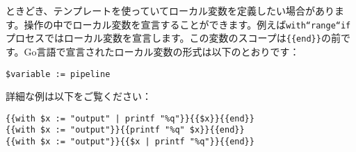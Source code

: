 ときどき、テンプレートを使っていてローカル変数を定義したい場合があります。操作の中でローカル変数を宣言することができます。例えば\texttt{with``range``if}プロセスではローカル変数を宣言します。この変数のスコープは\texttt{\{\{end\}\}}の前です。Go言語で宣言されたローカル変数の形式は以下のとおりです：


\begin{lstlisting}[numbers=none]
$variable := pipeline
\end{lstlisting}

詳細な例は以下をご覧ください：

\begin{lstlisting}[numbers=none]
{{with $x := "output" | printf "%q"}}{{$x}}{{end}}
{{with $x := "output"}}{{printf "%q" $x}}{{end}}
{{with $x := "output"}}{{$x | printf "%q"}}{{end}}
\end{lstlisting}

